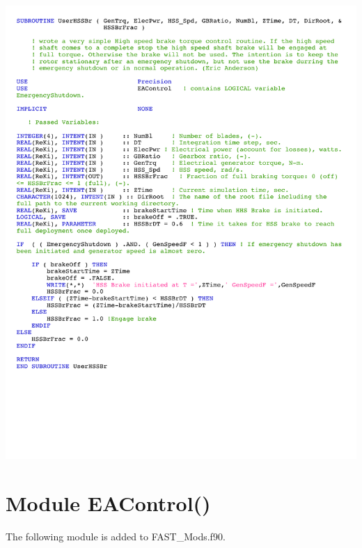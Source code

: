 \noindent
\includegraphics[width=\linewidth]{Figures/AppendixDFigures/figD-4.pdf}

\section{Module EAControl()} \label{sectionD-5}
The following module is added to FAST\_Mods.f90.

